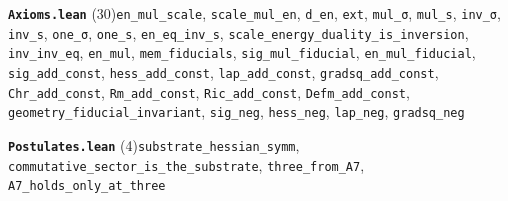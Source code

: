 \documentclass[11pt,a4paper]{article}
\theoremstyle{sudef}
\begin{document}
\noindent\textbf{\texttt{Axioms.lean}} (30)\quad \texttt{en\_\allowbreak mul\_\allowbreak scale}, \texttt{scale\_\allowbreak mul\_\allowbreak en}, \texttt{d\_\allowbreak en}, \texttt{ext}, \texttt{mul\_\allowbreak σ}, \texttt{mul\_\allowbreak s}, \texttt{inv\_\allowbreak σ}, \texttt{inv\_\allowbreak s}, \texttt{one\_\allowbreak σ}, \texttt{one\_\allowbreak s}, \texttt{en\_\allowbreak eq\_\allowbreak inv\_\allowbreak s}, \texttt{scale\_\allowbreak energy\_\allowbreak duality\_\allowbreak is\_\allowbreak inversion}, \texttt{inv\_\allowbreak inv\_\allowbreak eq}, \texttt{en\_\allowbreak mul}, \texttt{mem\_\allowbreak fiducials}, \texttt{sig\_\allowbreak mul\_\allowbreak fiducial}, \texttt{en\_\allowbreak mul\_\allowbreak fiducial}, \texttt{sig\_\allowbreak add\_\allowbreak const}, \texttt{hess\_\allowbreak add\_\allowbreak const}, \texttt{lap\_\allowbreak add\_\allowbreak const}, \texttt{gradsq\_\allowbreak add\_\allowbreak const}, \texttt{Chr\_\allowbreak add\_\allowbreak const}, \texttt{Rm\_\allowbreak add\_\allowbreak const}, \texttt{Ric\_\allowbreak add\_\allowbreak const}, \texttt{Defm\_\allowbreak add\_\allowbreak const}, \texttt{geometry\_\allowbreak fiducial\_\allowbreak invariant}, \texttt{sig\_\allowbreak neg}, \texttt{hess\_\allowbreak neg}, \texttt{lap\_\allowbreak neg}, \texttt{gradsq\_\allowbreak neg}\par\smallskip
\noindent\textbf{\texttt{Postulates.lean}} (4)\quad \texttt{substrate\_\allowbreak hessian\_\allowbreak symm}, \texttt{commutative\_\allowbreak sector\_\allowbreak is\_\allowbreak the\_\allowbreak substrate}, \texttt{three\_\allowbreak from\_\allowbreak A7}, \texttt{A7\_\allowbreak holds\_\allowbreak only\_\allowbreak at\_\allowbreak three}\par\smallskip
\end{document}
